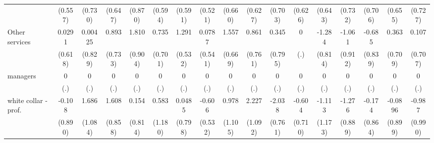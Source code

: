 {\begin{tabular}{l*{16}{c}}
                    &     (0.557)         &     (0.730)         &     (0.647)         &     (0.870)         &     (0.594)         &     (0.591)         &     (0.521)         &     (0.660)         &     (0.627)         &     (0.703)         &     (0.626)         &     (0.643)         &     (0.732)         &     (0.706)         &     (0.655)         &     (0.727)         \\
[1em]
Other services      &      0.0291         &     0.00425         &       0.893         &       1.810\sym{*}  &       0.735         &       1.291\sym{*}  &      0.0787         &       1.557\sym{*}  &       0.861         &       0.345         &           0         &      -1.284         &      -1.061         &      -0.685         &       0.363         &       0.107         \\
                    &     (0.618)         &     (0.829)         &     (0.733)         &     (0.904)         &     (0.701)         &     (0.532)         &     (0.541)         &     (0.669)         &     (0.761)         &     (0.795)         &         (.)         &     (0.814)         &     (0.912)         &     (0.839)         &     (0.709)         &     (0.707)         \\
[1em]
managers            &           0         &           0         &           0         &           0         &           0         &           0         &           0         &           0         &           0         &           0         &           0         &           0         &           0         &           0         &           0         &           0         \\
                    &         (.)         &         (.)         &         (.)         &         (.)         &         (.)         &         (.)         &         (.)         &         (.)         &         (.)         &         (.)         &         (.)         &         (.)         &         (.)         &         (.)         &         (.)         &         (.)         \\
[1em]
white collar - prof.&      -0.108         &       1.686         &       1.608         &       0.154         &       0.583         &      0.0485         &      -0.606         &       0.978         &       2.227\sym{*}  &      -2.038\sym{**} &      -0.604         &      -1.113         &      -1.276         &      -0.174         &     -0.0896         &      -0.987         \\
                    &     (0.890)         &     (1.084)         &     (0.858)         &     (0.814)         &     (1.180)         &     (0.798)         &     (0.532)         &     (1.105)         &     (1.092)         &     (0.761)         &     (0.710)         &     (1.173)         &     (0.889)         &     (0.864)         &     (0.899)         &     (0.990)         \\

\end{tabular}}

